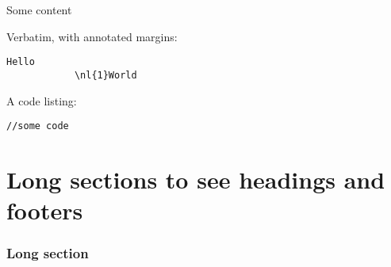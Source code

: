 \documentclass[a4paper,12pt,fleqn,twoside,openright,titlepagestyle=phpro]{yapbook}
\begin{document}

            \begin{Exercise*}[title={This is an Exercise},difficulty=1]

            \ExePart

            Some content

            \end{Exercise*}

            Verbatim, with annotated margins:

            \begin{Verbatim}[commandchars=\\\{\}]
            Hello
            \nl{1}World
            \end{Verbatim}

            A code listing:

            \begin{lstlisting}[caption={This is the title}]
            //some code
            \end{lstlisting}


    \part{Long sections to see headings and footers}

        \section{Long section}

        \lipsum
        \lipsum
        \lipsum





\appendix

\backmatter



%
%
\end{document}
